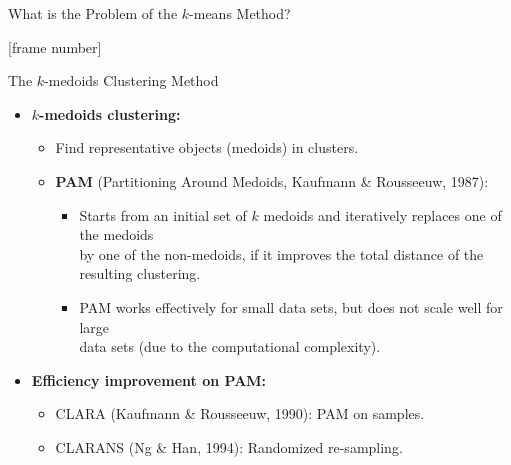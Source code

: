 \documentclass[aspectratio=169,t,xcolor=dvipsnames]{beamer}
\begin{document}
{\begin{frame}{What is the Problem of the $k$-means Method?}
    \end{frame}
  }

  {
    [frame number]
    \begin{frame}{The $k$-medoids Clustering Method}
      \begin{itemize}
        \item \textbf{$k$-medoids clustering:}
        \begin{itemize}
          \item Find representative objects (medoids) in clusters.
          \item \textbf{PAM} (Partitioning Around Medoids, Kaufmann \& Rousseeuw, 1987):
            \begin{itemize}
              \item Starts from an initial set of $k$ medoids and iteratively replaces one of the medoids \\
              by one of the non-medoids, if it improves the total distance of the resulting clustering.
              \item PAM works effectively for small data sets, but does not scale well for large\\
              data sets (due to the computational complexity).
            \end{itemize}
            \end{itemize}
        \item \textbf{Efficiency improvement on PAM:}
        \begin{itemize}
          \item CLARA (Kaufmann \& Rousseeuw, 1990): PAM on samples.
          \item CLARANS (Ng \& Han, 1994): Randomized re-sampling.
        \end{itemize}
      \end{itemize}
    \end{frame}
  }
\end{document}
